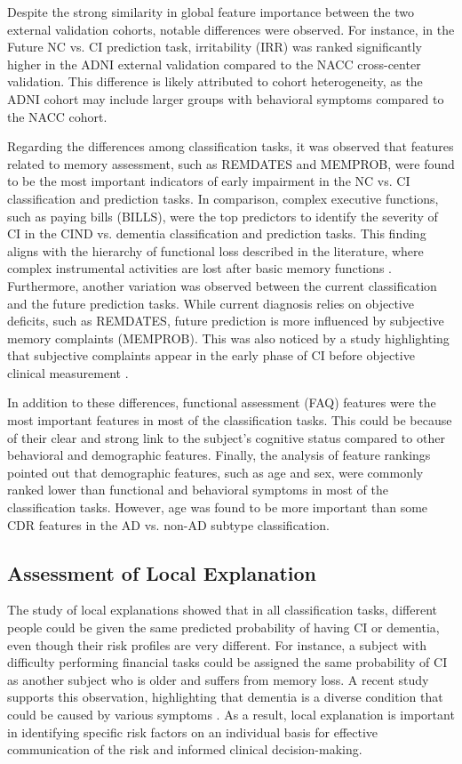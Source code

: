 Despite the strong similarity in global feature importance between the two external validation cohorts, notable differences were observed. For instance, in the Future NC vs. CI prediction task, irritability (IRR) was ranked significantly higher in the ADNI external validation compared to the NACC cross-center validation. This difference is likely attributed to cohort heterogeneity, as the ADNI cohort may include larger groups with behavioral symptoms compared to the NACC cohort.

Regarding the differences among classification tasks, it was observed that features related to memory assessment, such as REMDATES and MEMPROB, were found to be the most important indicators of early impairment in the NC vs. CI classification and prediction tasks. In comparison, complex executive functions, such as paying bills (BILLS), were the top predictors to identify the severity of CI in the CIND vs. dementia classification and prediction tasks. This finding aligns with the hierarchy of functional loss described in the literature, where complex instrumental activities are lost after basic memory functions \cite{Njegovan2001Hierarchy}. Furthermore, another variation was observed between the current classification and the future prediction tasks. While current diagnosis relies on objective deficits, such as REMDATES, future prediction is more influenced by subjective memory complaints (MEMPROB). This was also noticed by a study highlighting that subjective complaints appear in the early phase of CI before objective clinical measurement \cite{Jessen2014Conceptual}.

In addition to these differences, functional assessment (\acrshort{FAQ}) features were the most important features in most of the classification tasks. This could be because of their clear and strong link to the subject's cognitive status compared to other behavioral and demographic features. Finally, the analysis of feature rankings pointed out that demographic features, such as age and sex, were commonly ranked lower than functional and behavioral symptoms in most of the classification tasks. However, age was found to be more important than some CDR features in the AD vs. non-AD subtype classification.

\subsection{Assessment of Local Explanation}
The study of local explanations showed that in all classification tasks, different people could be given the same predicted probability of having CI or dementia, even though their risk profiles are very different. For instance, a subject with difficulty performing financial tasks could be assigned the same probability of CI as another subject who is older and suffers from memory loss. A recent study supports this observation, highlighting that dementia is a diverse condition that could be caused by various symptoms \cite{Vogel2021Four}. As a result, local explanation is important in identifying specific risk factors on an individual basis for effective communication of the risk and informed clinical decision-making.

